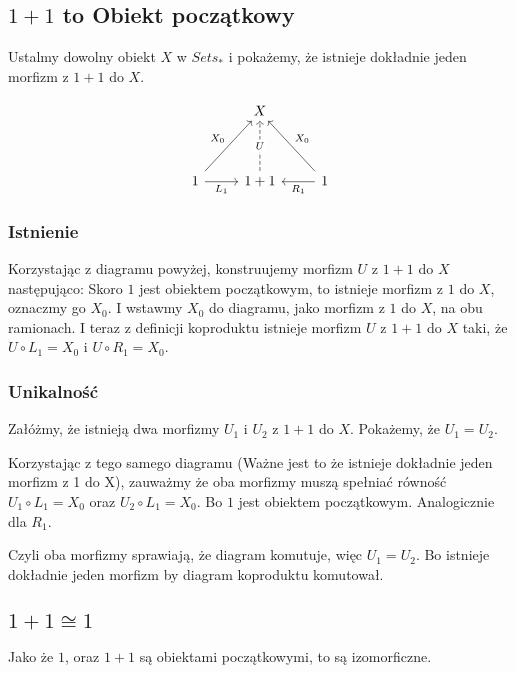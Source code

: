 \documentclass[11pt]{article}
\begin{document}
\subsection{$1 + 1$ to Obiekt początkowy}
Ustalmy dowolny obiekt $X$ w $Sets_*$ i pokażemy, że istnieje dokładnie jeden morfizm z $1 + 1$ do $X$.

\[
    \begin{tikzcd}[row sep=huge]
        & X  & \\
        1\ar[ur,"X_0"] \ar[r,"L_1", swap] & 1 + 1 \ar[u,dashed,"U" description] & 1 \ar[ul,"X_0", swap] \ar[l,"R_1"]
    \end{tikzcd}
\]


\subsubsection{Istnienie}
Korzystając z diagramu powyżej, konstruujemy morfizm $U$ z $1 + 1$ do $X$ następująco:
Skoro $1$ jest obiektem początkowym, to istnieje morfizm z $1$ do $X$, oznaczmy go $X_0$.
I wstawmy $X_0$ do diagramu, jako morfizm z $1$ do $X$, na obu ramionach. I teraz z definicji koproduktu istnieje morfizm $U$ z $1 + 1$ do $X$ taki, że $U \circ L_1 = X_0$ i $U \circ R_1 = X_0$.

\subsubsection{Unikalność}
Załóżmy, że istnieją dwa morfizmy $U_1$ i $U_2$ z $1 + 1$ do $X$. Pokażemy, że $U_1 = U_2$.


Korzystając z tego samego diagramu (Ważne jest to że istnieje dokładnie jeden morfizm z 1 do X), zauważmy że oba morfizmy muszą spełniać równość $U_1 \circ L_1 = X_0$ oraz $U_2 \circ L_1 = X_0$. Bo $1$ jest obiektem początkowym. Analogicznie dla $R_1$.

Czyli oba morfizmy sprawiają, że diagram komutuje, więc $U_1 = U_2$. Bo istnieje dokładnie jeden morfizm by diagram koproduktu komutował.

\subsection{$1 + 1 \cong 1$}
Jako że $1$, oraz $1 + 1$ są obiektami początkowymi, to są izomorficzne.
\end{document}
